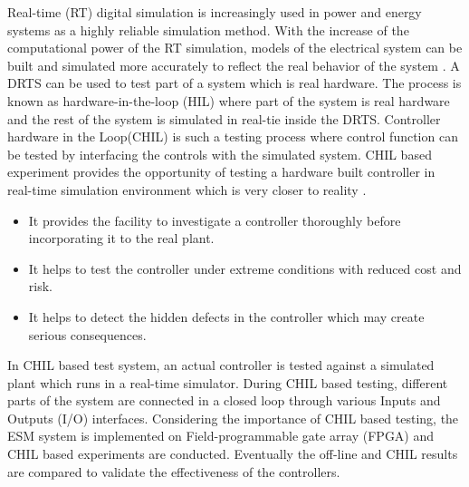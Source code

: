 Real-time (RT) digital simulation is increasingly used in power and energy systems as a highly reliable simulation method. With the increase of the computational power of the RT simulation, models of the electrical system can be built and simulated more accurately to reflect the real behavior of the system \cite{guillaud2015applications}. A DRTS can be used to test part of a system which is real hardware. The process is known as hardware-in-the-loop (HIL) where part of the system is real hardware and the rest of the system is simulated in real-tie inside the DRTS. Controller hardware in the Loop(CHIL) is such a testing process where control function can be tested by interfacing the controls with the simulated system. CHIL based experiment provides the opportunity of testing a hardware built controller in real-time simulation environment which is very closer to reality \cite{faruque2010hardware,yoo2012hardware}.
\begin{itemize}
    \item It provides the facility to investigate a controller thoroughly before incorporating it to the real plant.
    
    \item It helps to test the controller under extreme conditions with reduced cost and risk.
    
    \item It helps to detect the hidden defects in the controller which may create serious consequences.
\end{itemize}
In CHIL based test system, an actual controller is tested against a simulated plant which runs in a real-time simulator. During CHIL based testing, different parts of the system are connected in a closed loop through various Inputs and Outputs (I/O) interfaces. Considering the importance of CHIL based testing, the ESM system is implemented on Field-programmable gate array (FPGA) and CHIL based experiments are conducted. Eventually the off-line and CHIL results are compared to validate the effectiveness of the controllers.
